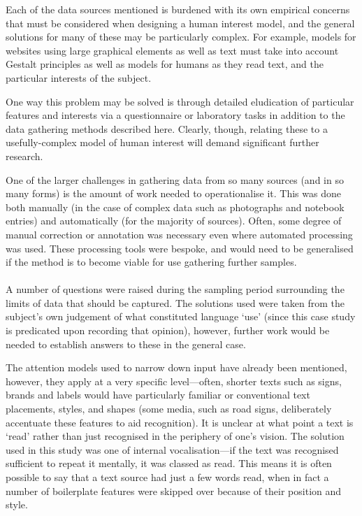 Each of the data sources mentioned is burdened with its own empirical concerns that must be considered when designing a human interest model, and the general solutions for many of these may be particularly complex.  For example, models for websites using large graphical elements as well as text must take into account Gestalt principles as well as models for humans as they read text, and the particular interests of the subject.

One way this problem may be solved is through detailed eludication of particular features and interests via a questionnaire or laboratory tasks in addition to the data gathering methods described here.  Clearly, though, relating these to a usefully-complex model of human interest will demand significant further research.




One of the larger challenges in gathering data from so many sources (and in so many forms) is the amount of work needed to operationalise it.  This was done both manually (in the case of complex data such as photographs and notebook entries) and automatically (for the majority of sources).  Often, some degree of manual correction or annotation was necessary even where automated processing was used.  These processing tools were bespoke, and would need to be generalised if the method is to become viable for use gathering further samples.



\paragraph{}
A number of questions were raised during the sampling period surrounding the limits of data that should be captured.  The solutions used were taken from the subject's own judgement of what constituted language `use' (since this case study is predicated upon recording that opinion), however, further work would be needed to establish answers to these in the general case.


The attention models used to narrow down input have already been mentioned, however, they apply at a very specific level---often, shorter texts such as signs, brands and labels would have particularly familiar or conventional text placements, styles, and shapes (some media, such as road signs, deliberately accentuate these features to aid recognition).  It is unclear at what point a text is `read' rather than just recognised in the periphery of one's vision.  The solution used in this study was one of internal vocalisation---if the text was recognised sufficient to repeat it mentally, it was classed as read.  This means it is often possible to say that a text source had just a few words read, when in fact a number of boilerplate features were skipped over because of their position and style.


